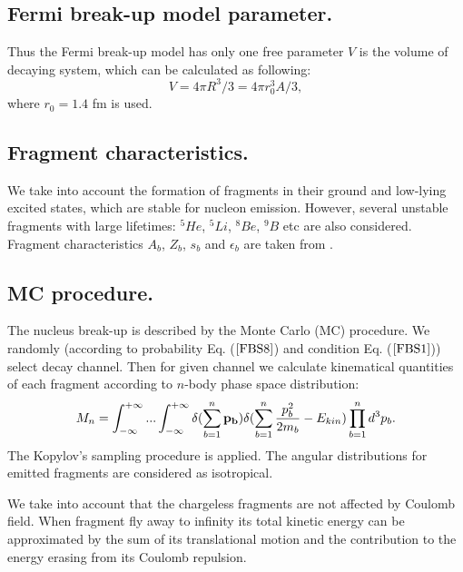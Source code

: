 \subsection{Fermi break-up model parameter.} 

\hspace{1.0em}Thus the Fermi break-up model has only one free parameter
$V$ is the volume of decaying system, which can be calculated as
following:
\begin{equation}
\label{FBS9} V = 4\pi R^3/3 = 4\pi r_{0}^3 A/3,
\end{equation}
where $r_{0} = 1.4 $ fm is used.

\subsection{ Fragment characteristics.}

We take into account the formation of fragments in their ground and
low-lying excited states, which are stable for nucleon
emission. However, several unstable fragments with large lifetimes:
$^{5}He$, $^{5}Li$, $^{8}Be$, $^{9}B$ etc are also considered.  Fragment
characteristics $A_b$, $Z_b$, $s_b$ and $\epsilon_b$ are taken from
\cite{AS81}.


\subsection{ MC procedure.} 

\hspace{1.0em}The nucleus break-up is described by the Monte Carlo (MC)
procedure. We randomly (according to probability Eq. ($\ref{FBS8}$) and
condition Eq. ($\ref{FBS1}$)) select decay channel. Then for given
channel we calculate kinematical quantities of each fragment according
to $n$-body phase space distribution:
\begin{equation}
\label{FBS10}M_{n} = \int_{-\infty}^{+\infty}...\int_{-\infty}^{+\infty}
\delta(\sum_{b=1}^{n} {\bf p_{b}}) \delta(\sum_{b=1}^{n}
\frac{p^2_b}{2m_b}-E_{kin})
\prod_{b=1}^{n} d^3p_b.
\end{equation}
The Kopylov's sampling procedure \cite{Kopylov70} is applied.  The angular
distributions for emitted fragments are considered as isotropical.

We take into account that the chargeless fragments are not affected by
Coulomb field. When fragment fly away to infinity its total kinetic
energy can be approximated by the sum of its translational motion and
the contribution to the energy erasing from its Coulomb repulsion.
